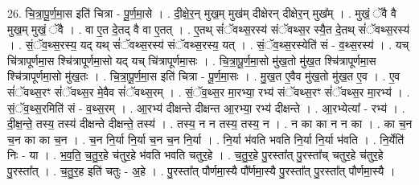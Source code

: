 \documentclass[17pt]{extarticle}
\begin{document}
26. चि॒त्रा॒पू॒र्ण॒मा॒स इति॑ चित्रा - पू॒र्ण॒मा॒से । . दी॒क्षे॒र॒न् मुख॒म् मुख॑म् दीक्षेरन् दीक्षेर॒न् मुख᳚म् । . मुखं॒ ॅवै वै मुख॒म् मुखं॒ ॅवै । . वा ए॒त दे॒तद् वै वा ए॒तत् । . ए॒तथ् सं॑ॅवथ्स॒रस्य॑ संॅवथ्स॒र स्यै॒त दे॒तथ् सं॑ॅवथ्स॒रस्य॑ । . सं॒ॅव॒थ्स॒रस्य॒ यद् यथ् सं॑ॅवथ्स॒रस्य॑ संॅवथ्स॒रस्य॒ यत् । . सं॒ॅव॒थ्स॒रस्येति॑ सं - व॒थ्स॒रस्य॑ । . यच् चि॑त्रापूर्णमा॒स श्चि॑त्रापूर्णमा॒सो यद् यच् चि॑त्रापूर्णमा॒सः । . चि॒त्रा॒पू॒र्ण॒मा॒सो मु॑ख॒तो मु॑ख॒त श्चि॑त्रापूर्णमा॒स श्चि॑त्रापूर्णमा॒सो मु॑ख॒तः । . चि॒त्रा॒पू॒र्ण॒मा॒स इति॑ चित्रा - पू॒र्ण॒मा॒सः । . मु॒ख॒त ए॒वैव मु॑ख॒तो मु॑ख॒त ए॒व । . ए॒व सं॑ॅवथ्स॒रꣳ सं॑ॅवथ्स॒र मे॒वैव सं॑ॅवथ्स॒रम् । . सं॒ॅव॒थ्स॒र मा॒रभ्या॒ रभ्य॑ संॅवथ्स॒रꣳ सं॑ॅवथ्स॒र मा॒रभ्य॑ । . सं॒ॅव॒थ्स॒रमिति॑ सं - व॒थ्स॒रम् । . आ॒रभ्य॑ दीक्षन्ते दीक्षन्त आ॒रभ्या॒ रभ्य॑ दीक्षन्ते । . आ॒रभ्येत्या᳚ - रभ्य॑ । . दी॒क्ष॒न्ते॒ तस्य॒ तस्य॑ दीक्षन्ते दीक्षन्ते॒ तस्य॑ । . तस्य॒ न न तस्य॒ तस्य॒ न । . न का का न न का । . का च॒न च॒न का का च॒न । . च॒न नि॒र्या नि॒र्या च॒न च॒न नि॒र्या । . नि॒र्या भ॑वति भवति नि॒र्या नि॒र्या भ॑वति । . नि॒र्येति॑ निः - या । . भ॒व॒ति॒ च॒तु॒र॒हे च॑तुर॒हे भ॑वति भवति चतुर॒हे । . च॒तु॒र॒हे पु॒रस्ता᳚त् पु॒रस्ता᳚च् चतुर॒हे च॑तुर॒हे पु॒रस्ता᳚त् । . च॒तु॒र॒ह इति॑ चतुः - अ॒हे । . पु॒रस्ता᳚त् पौर्णमा॒स्यै पौ᳚र्णमा॒स्यै पु॒रस्ता᳚त् पु॒रस्ता᳚त् पौर्णमा॒स्यै । \newline
\end{document}
